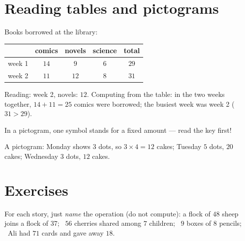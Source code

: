 \section{Reading tables and pictograms}

\begin{example}[A table]\label{ex:g3:problems:table}
Books borrowed at the library:
\begin{center}
\renewcommand{\arraystretch}{1.3}
\begin{tabular}{l|cccc}
 & comics & novels & science & total \\
\hline
week 1 & $14$ & $9$ & $6$ & $29$ \\
week 2 & $11$ & $12$ & $8$ & $31$ \\
\end{tabular}
\end{center}
Reading: week 2, novels: $12$. Computing from the table: in the two
weeks together, $14 + 11 = 25$ comics were borrowed; the busiest
week was week 2 ($31 > 29$).
\end{example}

\begin{example}[A pictogram]\label{ex:g3:problems:pictogram}
In a pictogram, one symbol stands for a fixed amount --- read the
key first!

\begin{omfigure}

{\small A pictogram: Monday shows $3$ dots, so $3 \times 4 = 12$
cakes; Tuesday $5$ dots, $20$ cakes; Wednesday $3$ dots, $12$
cakes.}
\end{omfigure}
\end{example}

\section{Exercises}

\begin{exercise}[$\star$]\label{exo:g3:problems:1}
For each story, just \emph{name} the operation (do not compute):
a flock of $48$ sheep joins a flock of $37$; \ $56$ cherries shared
among $7$ children; \ $9$ boxes of $8$ pencils; \ Ali had $71$ cards
and gave away $18$.
\end{exercise}

